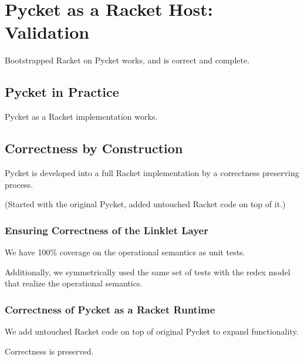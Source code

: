 \chapter{Pycket as a Racket Host: Validation}

	\begin{chapterpoint}
		Bootstrapped Racket on Pycket works, and is correct and complete.
	\end{chapterpoint}

	\section{Pycket in Practice}

		\begin{mainpoint}
			Pycket as a Racket implementation works.
		\end{mainpoint}

	\section{Correctness by Construction}

		\begin{mainpoint}
			Pycket is developed into a full Racket implementation by a correctness preserving process. 
			
			(Started with the original Pycket, added untouched Racket code on top of it.)
		\end{mainpoint}

		\subsection{Ensuring Correctness of the Linklet Layer}
			\begin{mainpoint}
				We have 100\% coverage on the operational semantics as unit tests.
				
				Additionally, we symmetrically used the same set of tests with the redex model that realize the operational semantics.
			\end{mainpoint}

		\subsection{Correctness of Pycket as a Racket Runtime}
			\begin{mainpoint}
				We add untouched Racket code on top of original Pycket to expand functionality.

				Correctness is preserved.
			\end{mainpoint}

